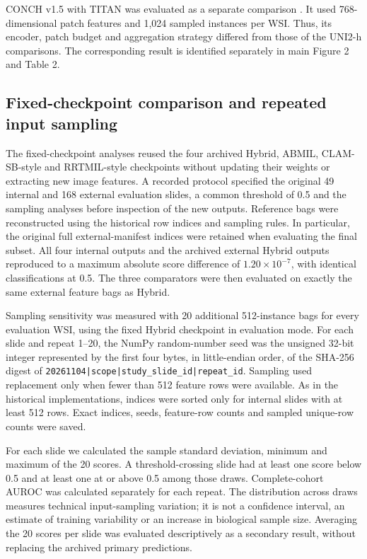 CONCH v1.5 with TITAN was evaluated as a separate comparison \citep{ref13}. It used 768-dimensional patch features and 1,024 sampled instances per WSI. Thus, its encoder, patch budget and aggregation strategy differed from those of the UNI2-h comparisons. The corresponding result is identified separately in main Figure 2 and Table 2.



\subsection{Fixed-checkpoint comparison and repeated input sampling}

The fixed-checkpoint analyses reused the four archived Hybrid, ABMIL, CLAM-SB-style and RRTMIL-style checkpoints without updating their weights or extracting new image features. A recorded protocol specified the original 49 internal and 168 external evaluation slides, a common threshold of 0.5 and the sampling analyses before inspection of the new outputs. Reference bags were reconstructed using the historical row indices and sampling rules. In particular, the original full external-manifest indices were retained when evaluating the final subset. All four internal outputs and the archived external Hybrid outputs reproduced to a maximum absolute score difference of $1.20\times10^{-7}$, with identical classifications at 0.5. The three comparators were then evaluated on exactly the same external feature bags as Hybrid.

Sampling sensitivity was measured with 20 additional 512-instance bags for every evaluation WSI, using the fixed Hybrid checkpoint in evaluation mode. For each slide and repeat 1--20, the NumPy random-number seed was the unsigned 32-bit integer represented by the first four bytes, in little-endian order, of the SHA-256 digest of \texttt{20261104|\allowbreak{}scope|\allowbreak{}study\_slide\_id|\allowbreak{}repeat\_id}. Sampling used replacement only when fewer than 512 feature rows were available. As in the historical implementations, indices were sorted only for internal slides with at least 512 rows. Exact indices, seeds, feature-row counts and sampled unique-row counts were saved.

For each slide we calculated the sample standard deviation, minimum and maximum of the 20 scores. A threshold-crossing slide had at least one score below 0.5 and at least one at or above 0.5 among those draws. Complete-cohort AUROC was calculated separately for each repeat. The distribution across draws measures technical input-sampling variation; it is not a confidence interval, an estimate of training variability or an increase in biological sample size. Averaging the 20 scores per slide was evaluated descriptively as a secondary result, without replacing the archived primary predictions.

